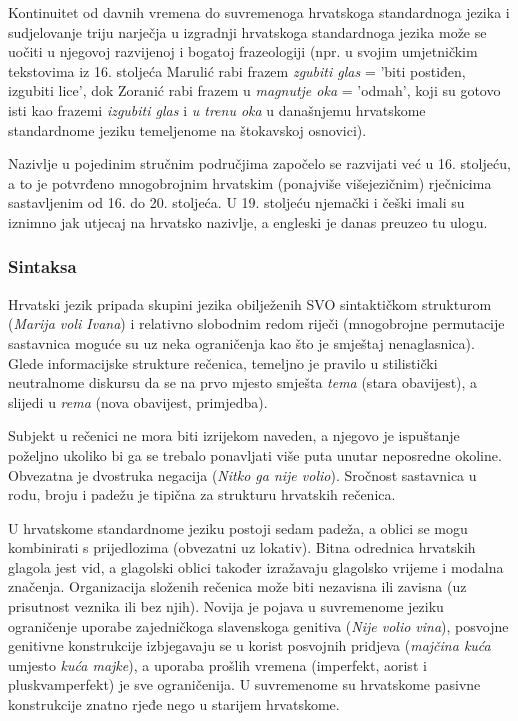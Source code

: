 \begin{multicols}{2}
Kontinuitet od davnih vremena do suvremenoga hrvatskoga standardnoga jezika i sudjelovanje triju narječja u izgradnji hrvatskoga standardnoga jezika može se uočiti u njegovoj razvijenoj i bogatoj frazeologiji (npr. u svojim umjetničkim tekstovima iz 16. stoljeća Marulić rabi frazem \emph{zgubiti glas} = 'biti postiđen, izgubiti lice', dok Zoranić rabi frazem u \emph{magnutje oka} = 'odmah', koji su gotovo isti kao frazemi \emph{izgubiti glas} i \emph{u trenu oka} u današnjemu hrvatskome standardnome jeziku temeljenome na štokavskoj osnovici).

Nazivlje u pojedinim stručnim područjima započelo se razvijati već u 16. stoljeću, a to je potvrđeno mnogobrojnim hrvatskim (ponajviše višejezičnim) rječnicima sastavljenim od 16. do 20. stoljeća. U 19. stoljeću njemački i češki imali su iznimno jak utjecaj na hrvatsko nazivlje, a engleski je danas preuzeo tu ulogu.

\subsubsection{Sintaksa}

Hrvatski jezik pripada skupini jezika obilježenih SVO sintaktičkom strukturom (\emph{Marija voli Ivana}) i relativno slobodnim redom riječi (mnogobrojne permutacije sastavnica moguće su uz neka ograničenja kao što je smještaj nenaglasnica). Glede informacijske strukture rečenica, temeljno je pravilo u stilistički neutralnome diskursu da se na prvo mjesto smješta \emph{tema} (stara obavijest), a slijedi u \emph{rema} (nova obavijest, primjedba).

Subjekt u rečenici ne mora biti izrijekom naveden, a njegovo je ispuštanje poželjno ukoliko bi ga se trebalo ponavljati više puta unutar neposredne okoline. Obvezatna je dvostruka negacija (\emph{Nitko ga nije volio}). Sročnost sastavnica u rodu, broju i padežu je tipična za strukturu hrvatskih rečenica. 

U hrvatskome standardnome jeziku postoji sedam padeža, a oblici se mogu kombinirati s prijedlozima (obvezatni uz lokativ). Bitna odrednica hrvatskih glagola jest vid, a glagolski oblici također izražavaju glagolsko vrijeme i modalna značenja. Organizacija složenih rečenica može biti nezavisna ili zavisna (uz prisutnost veznika ili bez njih). Novija je pojava u suvremenome jeziku ograničenje uporabe zajedničkoga slavenskoga genitiva (\emph{Nije volio vina}), posvojne genitivne konstrukcije izbjegavaju se u korist posvojnih pridjeva (\emph{majčina kuća} umjesto \emph{kuća majke}), a uporaba prošlih vremena (imperfekt, aorist i pluskvamperfekt) je sve ograničenija. U suvremenome su hrvatskome pasivne konstrukcije znatno rjeđe nego u starijem hrvatskome.


\end{multicols}
